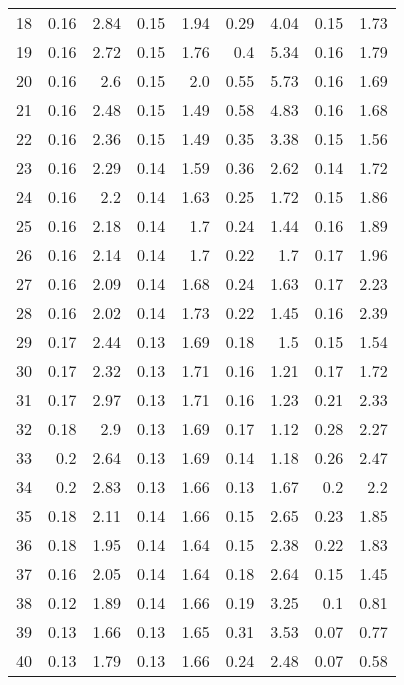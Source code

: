\begin{table}[h]
\begin{tabular}{crrrrrrrr}
		18&0.16&2.84&0.15&1.94&0.29&4.04&0.15&1.73\\
		19&0.16&2.72&0.15&1.76&0.4&5.34&0.16&1.79\\
		20&0.16&2.6&0.15&2.0&0.55&5.73&0.16&1.69\\
		21&0.16&2.48&0.15&1.49&0.58&4.83&0.16&1.68\\
		22&0.16&2.36&0.15&1.49&0.35&3.38&0.15&1.56\\
		23&0.16&2.29&0.14&1.59&0.36&2.62&0.14&1.72\\
		24&0.16&2.2&0.14&1.63&0.25&1.72&0.15&1.86\\
		25&0.16&2.18&0.14&1.7&0.24&1.44&0.16&1.89\\
		26&0.16&2.14&0.14&1.7&0.22&1.7&0.17&1.96\\
		27&0.16&2.09&0.14&1.68&0.24&1.63&0.17&2.23\\
		28&0.16&2.02&0.14&1.73&0.22&1.45&0.16&2.39\\
		29&0.17&2.44&0.13&1.69&0.18&1.5&0.15&1.54\\
		30&0.17&2.32&0.13&1.71&0.16&1.21&0.17&1.72\\
		31&0.17&2.97&0.13&1.71&0.16&1.23&0.21&2.33\\
		32&0.18&2.9&0.13&1.69&0.17&1.12&0.28&2.27\\
		33&0.2&2.64&0.13&1.69&0.14&1.18&0.26&2.47\\
		34&0.2&2.83&0.13&1.66&0.13&1.67&0.2&2.2\\
		35&0.18&2.11&0.14&1.66&0.15&2.65&0.23&1.85\\
		36&0.18&1.95&0.14&1.64&0.15&2.38&0.22&1.83\\
		37&0.16&2.05&0.14&1.64&0.18&2.64&0.15&1.45\\
		38&0.12&1.89&0.14&1.66&0.19&3.25&0.1&0.81\\
		39&0.13&1.66&0.13&1.65&0.31&3.53&0.07&0.77\\
		40&0.13&1.79&0.13&1.66&0.24&2.48&0.07&0.58\\
		\bottomrule
	\end{tabular}
	\label{table:completeMomentError}
\end{table}